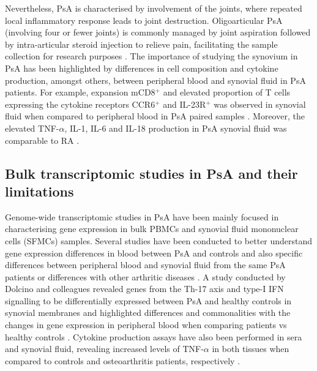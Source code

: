Nevertheless, PsA is characterised by involvement of the joints, where repeated local inflammatory response leads to joint destruction. Oligoarticular PsA (involving four or fewer joints) is commonly managed by joint aspiration followed by intra-articular steroid injection to relieve pain, facilitating the sample collection for research purposes \parencite{Kavanaugh2006}. The importance of studying the synovium in PsA has been highlighted by differences in cell composition and cytokine production, amongst others, between peripheral blood and synovial fluid in PsA patients. For example, expansion mCD8$^+$ and elevated proportion of T cells expressing the cytokine receptors CCR6$^+$ and IL-23R$^+$ was observed in synovial fluid when compared to peripheral blood  in PsA paired samples \parencite{Ross2000,Benham2013}. Moreover, the elevated TNF-$\alpha$, IL-1, IL-6 and IL-18 production in PsA synovial fluid was comparable to RA \parencite{Kuijk2006}. 


\subsection{Bulk transcriptomic studies in PsA and their limitations}

Genome-wide transcriptomic studies in PsA have been mainly focused in characterising gene expression in bulk PBMCs and synovial fluid mononuclear cells (SFMCs) samples. Several studies have been conducted to better understand gene expression differences in blood between PsA and controls and also specific differences between peripheral blood and synovial fluid from the same PsA patients or differences with other arthritic diseases \parencite{Stoeckman2006, Batliwalla2005, Gu2002, Dolcino2015}. A study conducted by Dolcino and colleagues revealed genes from the Th-17 axis and type-I IFN signalling to be differentially expressed between PsA and healthy controls in synovial membranes and highlighted differences and commonalities with the changes in gene expression in peripheral blood when comparing patients vs healthy controls . %
 Cytokine production assays have also been performed in sera and synovial fluid, revealing increased levels of TNF-$\alpha$ in both tissues when compared to controls and osteoarthritis patients, respectively \parencite{Ritchlin1998,Li2017}. 

